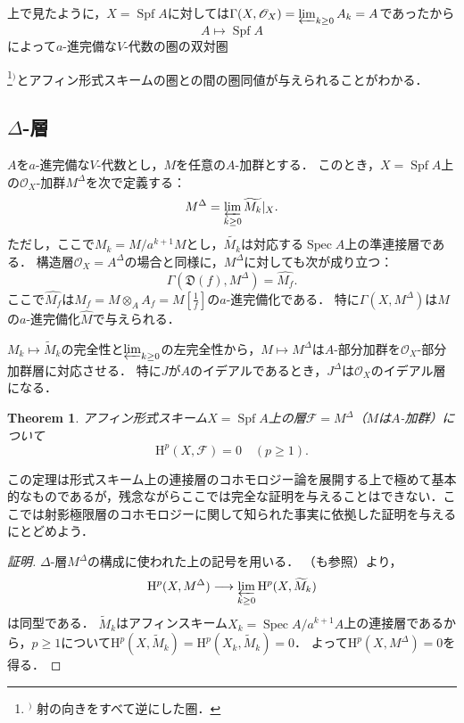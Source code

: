 \documentclass[a4paper,12pt, dvipdfmx]{jsbook}
\def\O{\mathscr{O}}
\def\til#1{\widetilde{#1}}%
\def\Spec{\mathop{\mathrm{Spec}}\nolimits}
\def\Spf{\mathop{\mathrm{Spf}}\nolimits}
\def\H{\mathrm{H}}
\theoremstyle{plain}
\newtheorem{thm}{\bfseries Theorem}[section]
\theoremstyle{definition}
\newcounter{chushaku}
\def\chu#1{\addtocounter{chushaku}{1}\footnote[\value{chushaku}]{${}^)$ #1}${}^)$}
\begin{document}
上で見たように，$X=\Spf A$に対しては$\Gamma(X,\O_X)=\varprojlim_{k\geq 0}A_k=A$であったから
$$
A\longmapsto\Spf A
$$
によって$a$-進完備な$V$-代数の圏の双対圏\chu{射の向きをすべて逆にした圏．}とアフィン形式スキームの圏との間の圏同値が与えられることがわかる．

\subsection{$\Delta$-層}\label{sub-deltaconstruction}
$A$を$a$-進完備な$V$-代数とし，$M$を任意の$A$-加群とする．
このとき，$X=\Spf A$上の$\O_X$-加群$M^{\Delta}$を次で定義する：
$$
M^{\Delta}=\varprojlim_{k\geq 0}\til{M_k}|_X.
$$
ただし，ここで$M_k=M/a^{k+1}M$とし，$\til{M_k}$は対応する$\Spec A$上の準連接層である．
構造層$\O_X=A^{\Delta}$の場合と同様に，$M^{\Delta}$に対しても次が成り立つ：
$$
\Gamma(\mathfrak{D}(f),M^{\Delta})=\widehat{M_f}.
$$
ここで$\widehat{M_f}$は$M_f=M\otimes_AA_f=M[\frac{1}{f}]$の$a$-進完備化である．
特に$\Gamma(X,M^{\Delta})$は$M$の$a$-進完備化$\widehat{M}$で与えられる．

$M_k\mapsto\til{M}_k$の完全性と$\varprojlim_{k\geq 0}$の左完全性から，$M\mapsto M^{\Delta}$は$A$-部分加群を$\O_X$-部分加群層に対応させる．
特に$J$が$A$のイデアルであるとき，$J^{\Delta}$は$\O_X$のイデアル層になる．

\begin{thm}\label{thm-deltaconstruction}{\rm 
アフィン形式スキーム$X=\Spf A$上の層$\mathscr{F}=M^{\Delta}$（$M$は$A$-加群）について
$$
\H^p(X,\mathscr{F})=0\quad(p\geq 1).
$$}
\end{thm}

この定理は形式スキーム上の連接層のコホモロジー論を展開する上で極めて基本的なものであるが，残念ながらここでは完全な証明を与えることはできない．ここでは射影極限層のコホモロジーに関して知られた事実\cite[$\mathbf{0}_{\mathbf{III}}$, (13.3.1)]{EGA}に依拠した証明を与えるにとどめよう．

\begin{proof}[証明]
$\Delta$-層$M^{\Delta}$の構成に使われた上の記号を用いる．
\cite[$\mathbf{0}_{\mathbf{III}}$, (13.3.1)]{EGA}（\cite[$\mathbf{0}_{\mathbf{III}}$, (13.3.2) (ii)]{EGA}も参照）より，
$$
\H^p(X,M^{\Delta})\longrightarrow\varprojlim_{k\geq 0}\H^p(X,\til{M}_k)
$$
は同型である．
$\til{M}_k$はアフィンスキーム$X_k=\Spec A/a^{k+1}A$上の連接層であるから，$p\geq 1$について$\H^p(X,\til{M}_k)=\H^p(X_k,\til{M}_k)=0$．
よって$\H^p(X,M^{\Delta})=0$を得る．
\end{proof}
\end{document}
